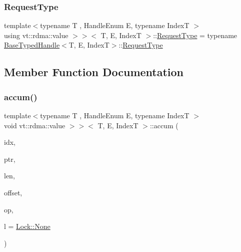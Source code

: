 \subsubsection{\texorpdfstring{Request\+Type}{RequestType}}
{\footnotesize\ttfamily template$<$typename T , Handle\+Enum E, typename IndexT $>$ \\
using vt\+::rdma\+::value $>$$>$$<$ T, E, IndexT $>$\+::\hyperlink{structvt_1_1rdma_1_1_base_typed_handle_a449c2c1948f5793c3fdfb1aba5801ed7}{Request\+Type} =  typename \hyperlink{structvt_1_1rdma_1_1_base_typed_handle}{Base\+Typed\+Handle}$<$T, E, IndexT$>$\+::\hyperlink{structvt_1_1rdma_1_1_base_typed_handle_a449c2c1948f5793c3fdfb1aba5801ed7}{Request\+Type}}



\subsection{Member Function Documentation}
\mbox{\label{structvt_1_1rdma_1_1_handle_3_01_t_00_01_e_00_01_index_t_00_01typename_01std_1_1enable__if__t_3_f66c3940d9f3649c3a5c3e77d63c658a_a8182aefb99d33b103c671addb6bb28c2}} 
\subsubsection{\texorpdfstring{accum()}{accum()}}
{\footnotesize\ttfamily template$<$typename T , Handle\+Enum E, typename IndexT $>$ \\
void vt\+::rdma\+::value $>$$>$$<$ T, E, IndexT $>$\+::accum (\begin{DoxyParamCaption}\item[{IndexT const \&}]{idx,  }\item[{T $\ast$}]{ptr,  }\item[{std\+::size\+\_\+t}]{len,  }\item[{int}]{offset,  }\item[{M\+P\+I\+\_\+\+Op}]{op,  }\item[{\hyperlink{namespacevt_1_1rdma_ac5c20b41a653e520b6305d4d454ecb70}{Lock}}]{l = {\ttfamily \hyperlink{namespacevt_1_1rdma_ac5c20b41a653e520b6305d4d454ecb70a6adf97f83acf6453d4a6a4b1070f3754}{Lock\+::\+None}} }\end{DoxyParamCaption})}




